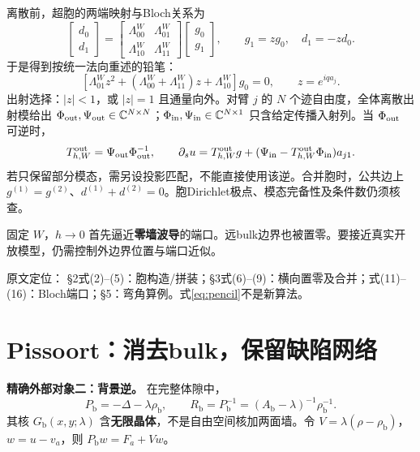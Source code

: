 \documentclass[UTF8,fontset=none,11pt,a4paper]{ctexart}
\newcommand{\inn}{\mathrm{in}}\newcommand{\ext}{\mathrm{ext}}
\newcommand{\bulk}{\mathrm{b}}
\newcommand{\source}[1]{{\small\raggedright\color{teal}原文定位：#1\par}}
\newcommand{\takeaway}[1]{\begin{tcolorbox}[colback=pale,colframe=navy,boxrule=.5pt,arc=1mm,left=2mm,right=2mm,top=1.5mm,bottom=1.5mm]#1\end{tcolorbox}}
\newcommand{\nextpage}{\clearpage}
\begin{document}
离散前，超胞的两端映射与Bloch关系为
\begin{equation}
 \begin{bmatrix}d_0\\d_1\end{bmatrix}
 =\begin{bmatrix}\Lambda_{00}^{W}&\Lambda_{01}^{W}\\
                  \Lambda_{10}^{W}&\Lambda_{11}^{W}\end{bmatrix}
 \begin{bmatrix}g_0\\g_1\end{bmatrix},\qquad
 g_1=z g_0,\quad d_1=-zd_0.
\end{equation}
于是得到按统一法向重述的铅笔：
\begin{equation}\label{eq:pencil}
 [\Lambda_{01}^{W}z^2+(\Lambda_{00}^{W}+\Lambda_{11}^{W})z
                  +\Lambda_{10}^{W}]g_0=0,\qquad z=e^{iqa_j}.
\end{equation}
出射选择：$|z|<1$，或 $|z|=1$ 且通量向外。对臂 $j$ 的 $N$ 个迹自由度，全体离散出射模给出 $\Phi_{\mathrm{out}},\Psi_{\mathrm{out}}\in\mathbb C^{N\times N}$；$\Phi_\inn,\Psi_\inn\in\C^{N\times1}$ 只含给定传播入射列。当 $\Phi_{\mathrm{out}}$ 可逆时，
\begin{equation}
 T_{h,W}^{\out}=\Psi_\out\Phi_\out^{-1},\qquad
 \partial_su=T_{h,W}^{\out}g+
 (\Psi_\inn-T_{h,W}^{\out}\Phi_\inn)a_{j1}.
\end{equation}
若只保留部分模态，需另设投影匹配，不能直接使用该逆。合并胞时，公共边上 $g^{(1)}=g^{(2)}$、$d^{(1)}+d^{(2)}=0$。胞Dirichlet极点、模态完备性及条件数仍须核查。

\takeaway{固定 $W$，$h\to0$ 首先逼近\textbf{零墙波导}的端口。远bulk边界也被置零。要接近真实开放模型，仍需控制外边界位置与端口近似。}
\source{\cite{hu2008} §2式(2)--(5)：胞构造/拼装；§3式(6)--(9)：横向置零及合并；式(11)--(16)：Bloch端口；§5：弯角算例。式\eqref{eq:pencil}不是新算法。}

\nextpage
\section{Pissoort：消去bulk，保留缺陷网络}
\textbf{精确外部对象二：背景逆。} 在完整体隙中，
\begin{equation}
 P_\bulk=-\Delta-\lambda\rho_\bulk,\qquad
 R_\bulk=P_\bulk^{-1}=(A_\bulk-\lambda)^{-1}\rho_\bulk^{-1}.
\end{equation}
其核 $G_\bulk(x,y;\lambda)$ 含\textbf{无限晶体}，不是自由空间核加两面墙。令 $V=\lambda(\rho-\rho_\bulk)$，$w=u-v_a$，则 $P_\bulk w=F_a+Vw$。
\end{document}
